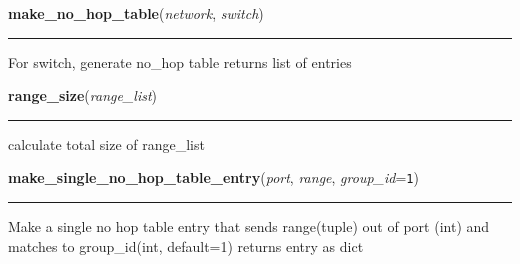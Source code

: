     \vspace{0.5ex}

\hspace{.8\funcindent}\begin{boxedminipage}{\funcwidth}

    \raggedright \textbf{make\_no\_hop\_table}(\textit{network}, \textit{switch})

    \vspace{-1.5ex}

    \rule{\textwidth}{0.5\fboxrule}
\setlength{\parskip}{2ex}
    For switch, generate no\_hop table returns list of entries

\setlength{\parskip}{1ex}
    \end{boxedminipage}

    \label{initialize_system:Write_Jsons:range_size}

    \vspace{0.5ex}

\hspace{.8\funcindent}\begin{boxedminipage}{\funcwidth}

    \raggedright \textbf{range\_size}(\textit{range\_list})

    \vspace{-1.5ex}

    \rule{\textwidth}{0.5\fboxrule}
\setlength{\parskip}{2ex}
    calculate total size of range\_list

\setlength{\parskip}{1ex}
    \end{boxedminipage}

    \label{initialize_system:Write_Jsons:make_single_no_hop_table_entry}

    \vspace{0.5ex}

\hspace{.8\funcindent}\begin{boxedminipage}{\funcwidth}

    \raggedright \textbf{make\_single\_no\_hop\_table\_entry}(\textit{port}, \textit{range}, \textit{group\_id}={\tt 1})

    \vspace{-1.5ex}

    \rule{\textwidth}{0.5\fboxrule}
\setlength{\parskip}{2ex}
    Make a single no hop table entry that sends range(tuple) out of port 
    (int) and matches to group\_id(int, default=1) returns entry as dict

\setlength{\parskip}{1ex}
    \end{boxedminipage}

